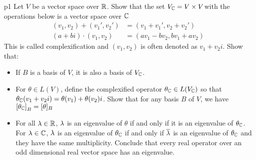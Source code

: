 \documentclass[a4paper, 11pt]{article}
\begin{document}
\begin{problem}{%
	}{p1%
}
Let $V$ be a vector space over $\mathbb{R}$. Show that the set $V_{\mathbb{C}}=V\times V$with the operations below is a vector space over $\mathbb{C}$ \begin{align*}
	(v_1,v_2)+(v_1',v_2')&= (v_1+v_1',v_2+v_2')\\
 (a+bi)\cdot (v_1,v_2)&=(av_1-bv_2,bv_1+av_2)
\end{align*}
This is called complexification and $(v_1,v_2)$ is often denoted as $v_1+v_2i$. Show that:\begin{itemize}[label=$\bullet$]
	\item If $B$ is a basis of $V$, it is also a basis of $V_{\mathbb{C}}$.
	\item For $\theta\in L(V)$, define the complexified operator $\theta_{\mathbb{C}}\in L(V_{\mathbb{C}})$ so that $\theta_{\mathbb{C}}(v_1+v_2i)=\theta(v_1)+\theta(v_2)i$. Show that for any basis $B$ of $V$, we have $\left[\theta_{\mathbb{C}}\right]_B=[\theta]_B$
	\item For all $\lambda\in\mathbb{R}$, $\lambda$ is an eigenvalue of $\theta$ if and only if it is an eigenvalue of $\theta_{\mathbb{C}}$. For $\lambda\in\mathbb{C}$, $\lambda$ is an eigenvalue of $\theta_{\mathbb{C}}$ if and only if $\overline{\lambda}$ is an eigenvalue of $\theta_{\mathbb{C}}$ and they have the same multiplicity. Conclude that every real operator over an odd dimensional real vector space has an eigenvalue.
\end{itemize}
\end{problem}
\end{document}
